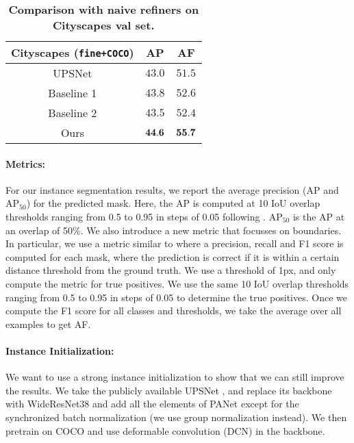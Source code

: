 \documentclass[10pt,twocolumn,letterpaper]{article}
\begin{document}
\begin{table}[t!]
\centering
{\begin{footnotesize}
  \begin{tabular}{|c|cc|}
  \hline
  Cityscapes (\texttt{fine+COCO}) & AP  & AF  \\ 
  \hline 
  UPSNet &$43.0$ &$51.5$\\
Baseline 1
  &$43.8$ &$52.6$\\
Baseline 2
  &$43.5$ &$52.4$\\
  Ours &$\bf{44.6}$ &$\bf{55.7}$ \\   
  \hline 
  \end{tabular}
  \end{footnotesize}}
  \caption{\textbf{
Comparison with naive refiners on Cityscapes val set.} }
  \label{tab:inst-val-results}
  \vspace{-4mm}
\end{table}


\vspace{-2mm}

\paragraph{Metrics:}
For our instance segmentation results, we report the average precision (AP and AP$_{50}$) for the predicted mask. Here, the AP is computed at 10 IoU overlap thresholds ranging from 0.5 to 0.95 in steps of 0.05 following \cite{cityscapes}. AP$_{50}$ is the AP at an overlap of 50\%. 
We also introduce a new metric that focusses on  boundaries.  In particular, we use a metric similar to \cite{wang2019delse, Perazzi2016} where a precision, recall and F1 score is computed for each mask,  where the prediction is correct if it is within a certain distance threshold from the ground truth. We use a threshold of 1px, and only compute the metric for  true positives. We   use the same 10 IoU overlap thresholds ranging from 0.5 to 0.95 in steps of 0.05 to determine the true positives. Once we compute the F1 score for all classes and thresholds, we take the average over all  examples to get AF. 

\vspace{-2mm}

\paragraph{Instance Initialization:}
We want to use a strong instance initialization to show that we can still improve the results.  We take the publicly available UPSNet \cite{upsnet}, and replace its backbone with WideResNet38 \cite{wideresnet} and add all the elements of PANet \cite{panet} except for the synchronized batch normalization (we use group normalization instead). We then pretrain on COCO  and use deformable convolution (DCN) \cite{dcn} in the backbone. 
\end{document}
